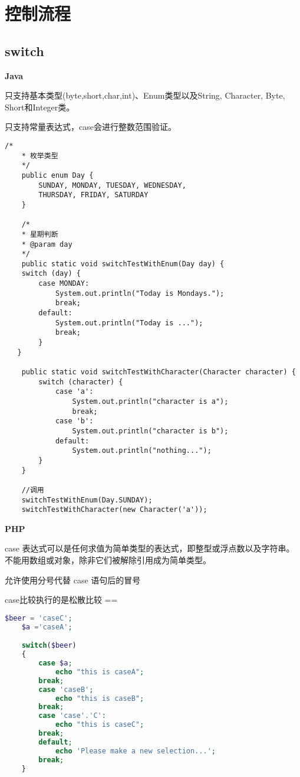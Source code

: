\chapter{控制流程}
\label{chap:control_flow}

\section{switch}

\textbf{Java}

只支持基本类型(byte,short,char,int)、Enum类型以及String, Character, Byte, Short和Integer类。

只支持常量表达式，case会进行整数范围验证。

\begin{lstlisting}[style=cjava,caption={swtich},label=useless]
    /*
    * 枚举类型
    */
    public enum Day {
        SUNDAY, MONDAY, TUESDAY, WEDNESDAY,
        THURSDAY, FRIDAY, SATURDAY 
    }

    /*
    * 星期判断
    * @param day
    */
    public static void switchTestWithEnum(Day day) {
    switch (day) {
        case MONDAY:
            System.out.println("Today is Mondays.");
            break;
        default:
            System.out.println("Today is ...");
            break;
        }
   }

    public static void switchTestWithCharacter(Character character) {
        switch (character) {
            case 'a':
                System.out.println("character is a");
                break;
            case 'b':
                System.out.println("character is b");
            default:
                System.out.println("nothing...");
        }
    }

    //调用
    switchTestWithEnum(Day.SUNDAY);
    switchTestWithCharacter(new Character('a'));
\end{lstlisting}


\textbf{PHP}

case 表达式可以是任何求值为简单类型的表达式，即整型或浮点数以及字符串。不能用数组或对象，除非它们被解除引用成为简单类型。

允许使用分号代替 case 语句后的冒号

case比较执行的是松散比较 ==

 \begin{lstlisting}[language=php,caption={php-swtich},label=useless]
    $beer = 'caseC';
    $a ='caseA';

    switch($beer)
    {
	    case $a;
		    echo "this is caseA";
		break;
	    case 'caseB';
		    echo "this is caseB";
		break;
	    case 'case'.'C':
	        echo "this is caseC";
	    break;
        default;
            echo 'Please make a new selection...';
        break;
    }
\end{lstlisting}
    
